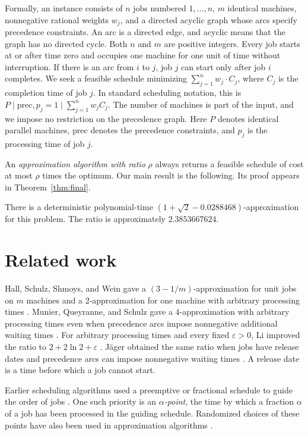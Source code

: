Formally, an instance consists of $n$ jobs numbered $1,\ldots,n$,
$m$ identical machines,
nonnegative rational weights $w_j$, and a directed acyclic graph whose
arcs specify precedence constraints. An arc is a directed edge, and acyclic
means that the graph has no directed cycle. Both $n$ and $m$ are positive integers.
Every job starts at or after time zero and occupies one machine for
one unit of time without interruption. If there is an arc from $i$ to
$j$, job $j$ can start only after job $i$ completes. We seek a feasible
schedule minimizing $\sum_{j=1}^{n} w_j\cdot C_j$, where $C_j$ is the completion time
of job $j$. In standard scheduling notation, this is
$P\mid\mathrm{prec},p_j=1\mid\sum_{j=1}^{n}w_j C_j$. The number of machines is
part of the input, and we impose no restriction on the precedence graph.
Here $P$ denotes identical parallel machines, $\mathrm{prec}$ denotes the
precedence constraints, and $p_j$ is the processing time of job $j$.

An \emph{approximation algorithm with ratio} $\rho$ always returns a feasible
schedule of cost at most $\rho$ times the optimum. Our main result is the
following. Its proof appears in Theorem~\ref{thm:final}.

\begin{theorem}
\label{thm:main}
There is a deterministic polynomial-time
$(1+\sqrt2-0.0288468)$-approximation for this problem. The ratio is
approximately $2.3853667624$.
\end{theorem}

\section{Related work}

Hall, Schulz, Shmoys, and Wein gave a $(3-1/m)$-approximation for unit
jobs on $m$ machines and a 2-approximation for one machine with arbitrary
processing times \cite[Theorem~2.3 and page~530]{HSSW1997}.
Munier, Queyranne, and Schulz gave a 4-approximation with arbitrary processing
times even when precedence arcs impose nonnegative additional waiting times
\cite{MQS1998}. For arbitrary processing times and every fixed
$\varepsilon>0$, Li improved the ratio to $2+2\ln 2+\varepsilon$
\cite[Theorem~1.1 of the full version]{Li2017}. J\"ager obtained the same
ratio when jobs have release dates and precedence arcs can impose nonnegative
waiting times \cite{Jaeger2018}. A release date is a time before which a job
cannot start.

Earlier scheduling algorithms used a preemptive or fractional schedule to
guide the order of jobs \cite{PhillipsEtAl1998,HSSW1997}. One such priority
is an \emph{$\alpha$-point}, the time by which a fraction $\alpha$ of a job
has been processed in the guiding schedule. Randomized choices of these points
have also been used in approximation algorithms
\cite{ChekuriEtAl2001,SchulzSkutella1997}.


